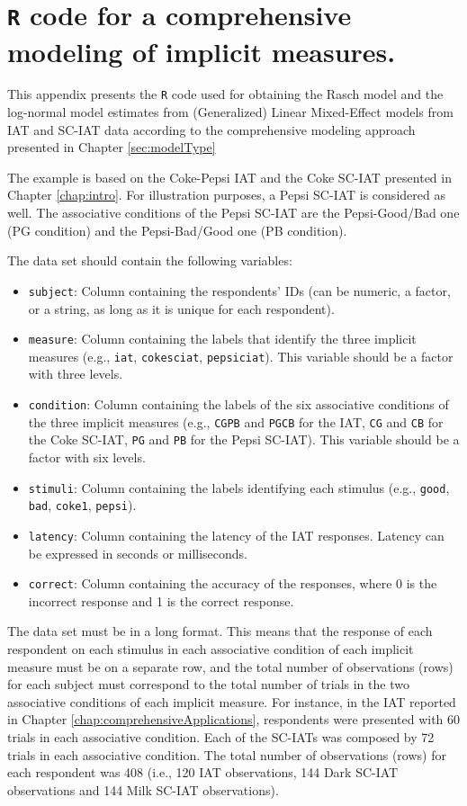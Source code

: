 \documentclass[12pt]{book}
\begin{document}
\chapter[Appendix B]{\texttt{R} code for a comprehensive modeling of implicit measures.} \label{chap:appendixB}

This appendix presents the \verb*|R| code used for obtaining the Rasch model and the log-normal model estimates from (Generalized) Linear Mixed-Effect models from IAT and SC-IAT data according to the comprehensive modeling approach presented in Chapter \ref{sec:modelType}

The example is based on the Coke-Pepsi IAT and the Coke SC-IAT presented in Chapter \ref{chap:intro}. 
For illustration purposes, a Pepsi SC-IAT is considered as well. 
The associative conditions of the Pepsi SC-IAT are the Pepsi-Good/Bad one (PG condition) and the Pepsi-Bad/Good one (PB condition). 

The data set should contain the following variables:

\begin{itemize}
	\item \texttt{subject}: Column containing the respondents' IDs (can be numeric, a factor, or a string, as long as it is unique for each respondent).
	\item\texttt{measure}: Column containing the labels that identify the three implicit measures (e.g., \texttt{iat}, \texttt{cokesciat}, \texttt{pepsiciat}). This variable should be a factor with three levels.
	\item\texttt{condition}: Column containing the labels of the six associative conditions of the three implicit measures (e.g., \texttt{CGPB} and \texttt{PGCB} for the IAT, \texttt{CG} and \texttt{CB} for the Coke SC-IAT, \texttt{PG} and \texttt{PB} for the Pepsi SC-IAT). This variable should be a factor with six levels.
	\item \texttt{stimuli}: Column containing the labels identifying each stimulus (e.g., \texttt{good}, \texttt{bad}, \texttt{coke1}, \texttt{pepsi}).
	\item \texttt{latency}: Column containing the latency of the IAT responses. Latency can be expressed in seconds or milliseconds.
	\item \texttt{correct}: Column containing the accuracy of the responses, where 0 is the incorrect response and 1 is the correct response.
\end{itemize}

The data set must be in a long format. 
This means that the response of each respondent on each stimulus in each associative condition of each implicit measure must be on a separate row, and the total number of observations (rows) for each subject must correspond to the total number of trials in the two associative conditions of each implicit measure. 
For instance, in the IAT reported in Chapter \ref{chap:comprehensiveApplications}, respondents were presented with 60 trials in each associative condition. Each of the SC-IATs was composed by 72 trials in each associative condition. 
The total number of observations (rows) for each respondent was 408 (i.e., 120 IAT observations, 144 Dark SC-IAT observations and 144 Milk SC-IAT observations).  
\end{document}
